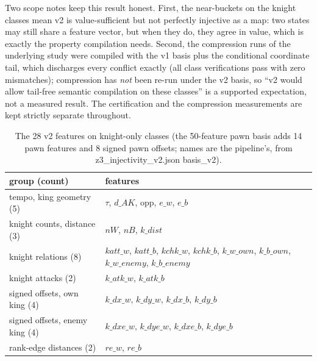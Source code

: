 \documentclass[conference]{IEEEtran}
\begin{document}
Two scope notes keep this result honest. First, the near-buckets on the
knight classes mean v2 is value-sufficient but not perfectly injective as a
map: two states may still share a feature vector, but when they do, they
agree in value, which is exactly the property compilation needs. Second,
the compression runs of the underlying study were compiled with the v1
basis plus the conditional coordinate tail, which discharges every conflict
exactly (all class verifications pass with zero mismatches); compression
has \emph{not} been re-run under the v2 basis, so ``v2 would allow tail-free
semantic compilation on these classes'' is a supported expectation, not a
measured result. The certification and the compression measurements are
kept strictly separate throughout.

\begin{table}[t]
\caption{The 28 v2 features on knight-only classes (the 50-feature pawn
basis adds 14 pawn features and 8 signed pawn offsets; names are the
pipeline's, from z3\_injectivity\_v2.json basis\_v2).}
\label{tab:features}
\centering
\scriptsize
\setlength{\tabcolsep}{3pt}
\begin{tabular}{@{}p{3.0cm}p{4.6cm}@{}}
\toprule
group (count) & features \\
\midrule
tempo, king geometry (5) & $\tau$, $d\_AK$, opp, $e\_w$, $e\_b$ \\
knight counts, distance (3) & $nW$, $nB$, $k\_dist$ \\
knight relations (8) & $katt\_w$, $katt\_b$, $kchk\_w$, $kchk\_b$, $k\_w\_own$, $k\_b\_own$, $k\_w\_enemy$, $k\_b\_enemy$ \\
knight attacks (2) & $k\_atk\_w$, $k\_atk\_b$ \\
signed offsets, own king (4) & $k\_dx\_w$, $k\_dy\_w$, $k\_dx\_b$, $k\_dy\_b$ \\
signed offsets, enemy king (4) & $k\_dxe\_w$, $k\_dye\_w$, $k\_dxe\_b$, $k\_dye\_b$ \\
rank-edge distances (2) & $re\_w$, $re\_b$ \\
\bottomrule
\end{tabular}
\end{table}
\end{document}
